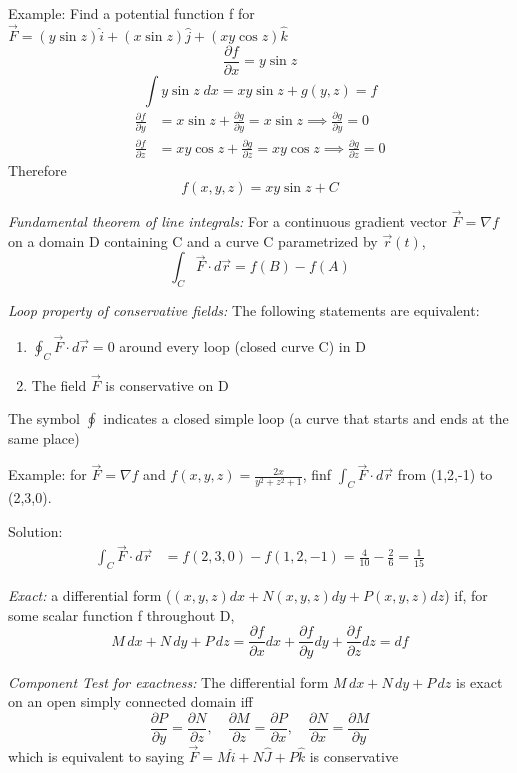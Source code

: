 \documentclass[12pt]{article}
\begin{document}
Example: Find a potential function f for $\vec{F} = (y\sin z) \hat{i} + (x\sin z) \hat{j} + (xy\cos z) \hat{k}$
\[ \frac{\partial f}{\partial x} = y\sin z\]
\[\int y \sin z \; dx = xy \sin z + g(y,z) = f\]
\begin{align*}
    \frac{\partial f}{\partial y} &= x\sin z + \frac{\partial g}{\partial y} = x \sin z \implies \frac{\partial g}{\partial y} = 0\\
    \frac{\partial f}{\partial z} &= xy\cos z + \frac{\partial g}{\partial z} = xy \cos z \implies \frac{\partial g}{\partial z} = 0
\end{align*}
Therefore
\[f(x,y,z) = xy \sin z + C\]

\emph{Fundamental theorem of line integrals:} For a continuous gradient vector $\vec{F} = \nabla f$ on a domain D containing C and a curve C parametrized by $\vec{r}(t)$,
\[\int_C \vec{F} \cdot d\vec{r} = f(B) - f(A)\]

\emph{Loop property of conservative fields:} The following statements are equivalent:
\begin{enumerate}
    \item $\oint_C \vec{F} \cdot d\vec{r} = 0$ around every loop (closed curve C) in D
    \item The field $\vec{F}$ is conservative on D
\end{enumerate}

The symbol $\oint$ indicates a closed simple loop (a curve that starts and ends at the same place)

Example: for $\vec{F} = \nabla f$ and $f(x,y,z) = \frac{2x}{y^2 + z^2 +1}$, finf $\int_C \vec{F} \cdot d\vec{r}$ from (1,2,-1) to (2,3,0).

Solution:
\begin{align*}
    \int_C \vec{F} \cdot d\vec{r} &= f(2,3,0) - f(1,2,-1) = \frac{4}{10} - \frac{2}{6} = \frac{1}{15}
\end{align*}

\emph{Exact:} a differential form ($(x,y,z) dx + N(x,y,z) dy + P(x,y,z)dz$) if, for some scalar function f throughout D,
\[M \, dx + N \, dy + P\, dz = \frac{\partial f}{\partial x} dx + \frac{\partial f}{\partial y} dy + \frac{\partial f}{\partial z} dz = df\]

\emph{Component Test for exactness:}
The differential form $M \, dx + N \, dy + P\, dz$ is exact on an open simply connected domain iff 
\[\frac{\partial P}{\partial y} =  \frac{\partial N}{\partial z}, \quad \frac{\partial M}{\partial z} = \frac{\partial P}{\partial x}, \quad \frac{\partial N}{\partial x} = \frac{\partial M}{\partial y} \] 
which is equivalent to saying $\vec{F} = M\hat{i} + N\hat{J} + P\hat{k}$ is conservative
\end{document}
